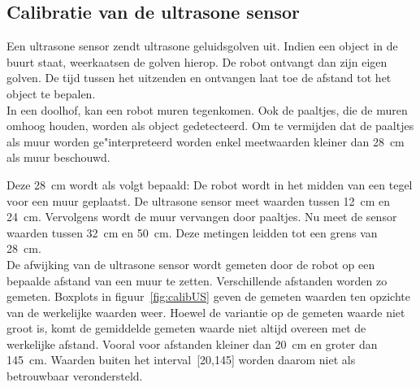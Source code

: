 \documentclass[t1]{penoverslag}
\begin{document}
\subsection{Calibratie van de ultrasone sensor} %
\label{ssec:calibUS}
Een ultrasone sensor zendt ultrasone geluidsgolven uit. Indien een object in de buurt staat, weerkaatsen de golven hierop. De robot ontvangt dan zijn eigen golven. De tijd tussen het uitzenden en ontvangen laat toe de afstand tot het object te bepalen.\\

In een doolhof, kan een robot muren tegenkomen. Ook de paaltjes, die de muren omhoog houden, worden als object gedetecteerd. Om te vermijden dat de paaltjes als muur worden ge"interpreteerd worden enkel meetwaarden kleiner dan 28~cm als muur beschouwd.

Deze 28~cm wordt als volgt bepaald: De robot wordt in het midden van een tegel voor een muur geplaatst. De ultrasone sensor meet waarden tussen 12~cm en 24~cm. Vervolgens wordt de muur vervangen door paaltjes. Nu meet de sensor waarden tussen 32~cm en 50~cm. Deze metingen leidden tot een grens van 28~cm.\\

De afwijking van de ultrasone sensor wordt gemeten door de robot op een bepaalde afstand van een muur te zetten. Verschillende afstanden worden zo gemeten. Boxplots in figuur~\ref{fig:calibUS} geven de gemeten waarden ten opzichte van de werkelijke waarden weer. Hoewel de variantie op de gemeten waarde niet groot is, komt de gemiddelde gemeten waarde niet altijd overeen met de werkelijke afstand. Vooral voor afstanden kleiner dan 20~cm en groter dan 145~cm. Waarden buiten het interval~[20,145] worden daarom niet als betrouwbaar verondersteld.
\end{document}
